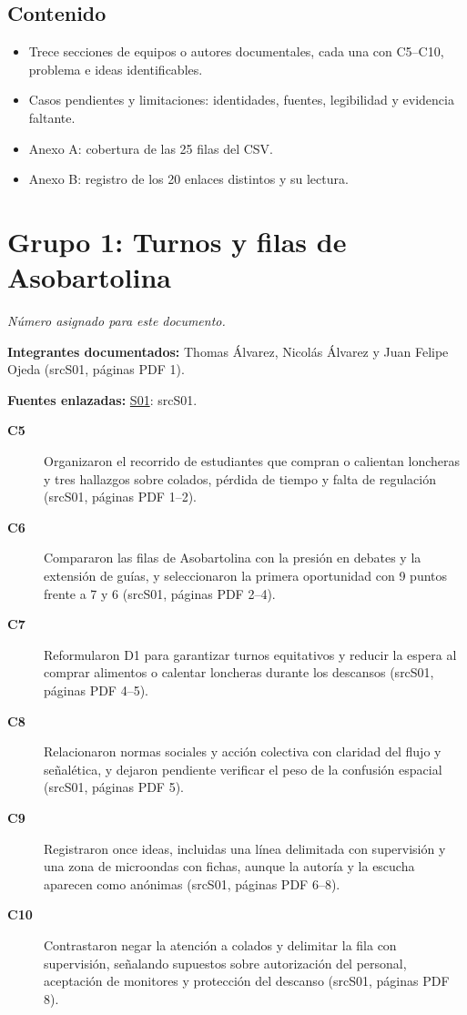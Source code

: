 \documentclass[11pt,a4paper]{article}
\newcommand{\evid}[2]{(\csname src#1\endcsname, páginas PDF #2)}
\begin{document}
\subsection*{Contenido}
\begin{itemize}
\item Trece secciones de equipos o autores documentales, cada una con C5--C10, problema e ideas identificables.
\item Casos pendientes y limitaciones: identidades, fuentes, legibilidad y evidencia faltante.
\item Anexo A: cobertura de las 25 filas del CSV.
\item Anexo B: registro de los 20 enlaces distintos y su lectura.
\end{itemize}
\clearpage
\section*{Grupo 1: Turnos y filas de Asobartolina}
\textit{Número asignado para este documento.}

\textbf{Integrantes documentados:} Thomas Álvarez, Nicolás Álvarez y Juan Felipe Ojeda \evid{S01}{1}.

\textbf{Fuentes enlazadas:} \hyperlink{fuente-S01}{S01}: \csname srcS01\endcsname.

\begin{description}
\item[\textbf{C5}] Organizaron el recorrido de estudiantes que compran o calientan loncheras y tres hallazgos sobre colados, pérdida de tiempo y falta de regulación \evid{S01}{1--2}.
\item[\textbf{C6}] Compararon las filas de Asobartolina con la presión en debates y la extensión de guías, y seleccionaron la primera oportunidad con 9 puntos frente a 7 y 6 \evid{S01}{2--4}.
\item[\textbf{C7}] Reformularon D1 para garantizar turnos equitativos y reducir la espera al comprar alimentos o calentar loncheras durante los descansos \evid{S01}{4--5}.
\item[\textbf{C8}] Relacionaron normas sociales y acción colectiva con claridad del flujo y señalética, y dejaron pendiente verificar el peso de la confusión espacial \evid{S01}{5}.
\item[\textbf{C9}] Registraron once ideas, incluidas una línea delimitada con supervisión y una zona de microondas con fichas, aunque la autoría y la escucha aparecen como anónimas \evid{S01}{6--8}.
\item[\textbf{C10}] Contrastaron negar la atención a colados y delimitar la fila con supervisión, señalando supuestos sobre autorización del personal, aceptación de monitores y protección del descanso \evid{S01}{8}.
\end{description}
\end{document}
